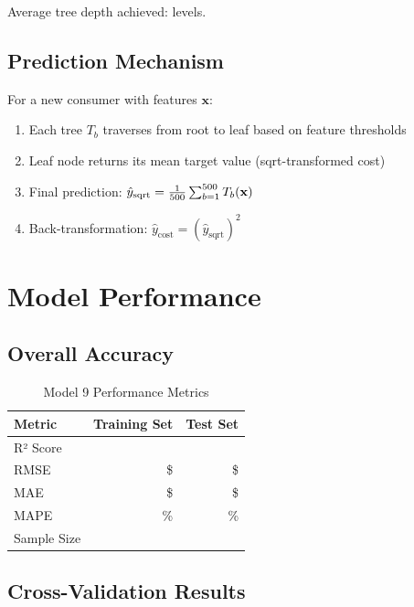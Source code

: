 Average tree depth achieved: \ModelNineAvgTreeDepth{} levels.

\subsection{Prediction Mechanism}

For a new consumer with features $\mathbf{x}$:

\begin{enumerate}
    \item Each tree $T_b$ traverses from root to leaf based on feature thresholds
    \item Leaf node returns its mean target value (sqrt-transformed cost)
    \item Final prediction: $\hat{y}_{\text{sqrt}} = \frac{1}{500{}}\sum_{b=1}^{500{}} T_b(\mathbf{x})$
    \item Back-transformation: $\hat{y}_{\text{cost}} = (\hat{y}_{\text{sqrt}})^2$
\end{enumerate}

\section{Model Performance}

\subsection{Overall Accuracy}

\begin{table}[h]
\centering
\caption{Model 9 Performance Metrics}
\begin{tabular}{lrr}
\toprule
\textbf{Metric} & \textbf{Training Set} & \textbf{Test Set} \\
\midrule
R² Score & \ModelNineRSquaredTrain{} & \ModelNineRSquaredTest{} \\
RMSE & \$\ModelNineRMSETrain{} & \$\ModelNineRMSETest{} \\
MAE & \$\ModelNineMAETrain{} & \$\ModelNineMAETest{} \\
MAPE & \ModelNineMAPETrain{}\% & \ModelNineMAPETest{}\% \\
Sample Size & \ModelNineTrainingSamples{} & \ModelNineTestSamples{} \\
\bottomrule
\end{tabular}
\label{tab:model9_performance}
\end{table}

\subsection{Cross-Validation Results}

